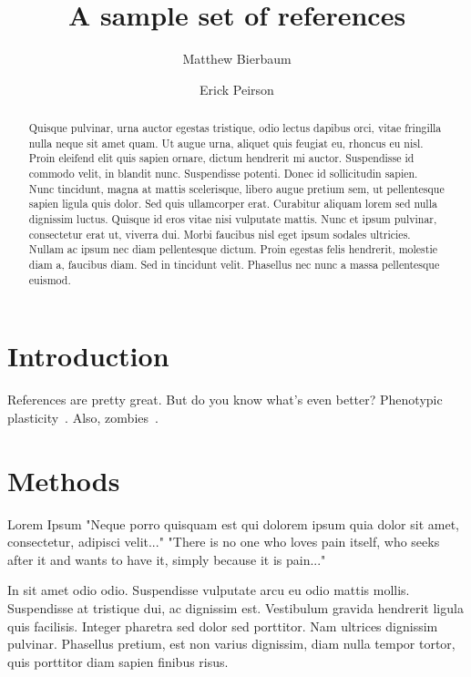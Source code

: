 \documentclass[twocolumn,aps]{revtex4}
\begin{document}
\title{A sample set of references}
\author{Matthew Bierbaum}
\author{Erick Peirson}

\begin{abstract}
    Quisque pulvinar, urna auctor egestas tristique, odio lectus dapibus orci,
    vitae fringilla nulla neque sit amet quam. Ut augue urna, aliquet quis
    feugiat eu, rhoncus eu nisl. Proin eleifend elit quis sapien ornare, dictum
    hendrerit mi auctor. Suspendisse id commodo velit, in blandit nunc.
    Suspendisse potenti. Donec id sollicitudin sapien. Nunc tincidunt, magna at
    mattis scelerisque, libero augue pretium sem, ut pellentesque sapien ligula
    quis dolor. Sed quis ullamcorper erat. Curabitur aliquam lorem sed nulla
    dignissim luctus. Quisque id eros vitae nisi vulputate mattis. Nunc et
    ipsum pulvinar, consectetur erat ut, viverra dui. Morbi faucibus nisl eget
    ipsum sodales ultricies. Nullam ac ipsum nec diam pellentesque dictum.
    Proin egestas felis hendrerit, molestie diam a, faucibus diam. Sed in
    tincidunt velit. Phasellus nec nunc a massa pellentesque euismod.
\end{abstract}

\maketitle

\section{Introduction}

References are pretty great. But do you know what's even better? Phenotypic
plasticity~\cite{peirson2015plasticity}. Also, zombies~\cite{alemi2015you}.

\section{Methods}

Lorem Ipsum "Neque porro quisquam est qui dolorem ipsum quia dolor sit amet,
consectetur, adipisci velit..." "There is no one who loves pain itself, who
seeks after it and wants to have it, simply because it is pain..."

In sit amet odio odio. Suspendisse vulputate arcu eu odio mattis mollis.
Suspendisse at tristique dui, ac dignissim est. Vestibulum gravida hendrerit
ligula quis facilisis. Integer pharetra sed dolor sed porttitor. Nam ultrices
dignissim pulvinar. Phasellus pretium, est non varius dignissim, diam nulla
tempor tortor, quis porttitor diam sapien finibus risus.
\end{document}
